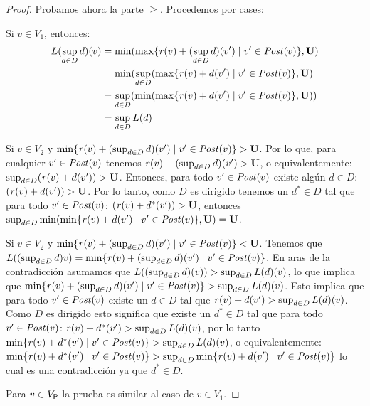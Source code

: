 \begin{proof}
    Probamos ahora la parte $\geq$.   Procedemos por cases:
    
    Si   $v \in V_1$,  entonces:
     \begin{align}
     L (\sup_{d \in D} d)(v) & = \min ( \max \{ \mathit{r}(v) + (\sup_{d \in D} d)(v') \mid v' \in \mathit{Post}(v)\},  \mathbf{U} ) \\                                                                                       
                                                     & =\min(  \sup_{d \in D} ( \max \{\mathit{r}(v) + d(v') \mid v' \in \mathit{Post}(v) \}, \mathbf{U} ) \\
                                                     & = \sup_{d \in D} (\min( \max \{ \mathit{r}(v) + d(v') \mid v' \in \mathit{Post}(v) \}, \mathbf{U})) \\
                                                     & =  \sup_{d \in D} L(d)
    \end{align}
    
    Si $v \in V_2$  y $\min \{ \mathit{r}(v) + (\sup_{d \in D} d)(v') \mid v' \in \mathit{Post}(v)\} > \mathbf{U}$. Por lo que, para
    cualquier $v' \in \mathit{Post}(v)$ tenemos  $\mathit{r}(v) + (\sup_{d \in D} d)(v') > \mathbf{U}$, o equivalentemente: 
    $\sup_{d \in D} (\mathit{r}(v) + d(v')) > \mathbf{U}$. Entonces, para todo $v' \in \mathit{Post}(v)$ existe algún $d \in D$: $(\mathit{r}(v) + d(v')) > \mathbf{U}$.
    Por lo tanto, como $D$ es dirigido tenemos un $d^* \in D$ tal que para todo $v' \in \mathit{Post}(v)$: $(\mathit{r}(v) + d^*(v')) > \mathbf{U}$, entonces 
    $\sup_{d \in D} \min ( \min \{ \mathit{r}(v) + d(v') \mid v' \in \mathit{Post}(v)\}, \mathbf{U}) = \mathbf{U}$.
     
     Si $v \in V_2$  y $\min \{ \mathit{r}(v) + (\sup_{d \in D} d)(v') \mid v' \in \mathit{Post}(v)\} < \mathbf{U}$.  Tenemos que
     $L((\sup_{d \in D} d) v) = \min \{ \mathit{r}(v) + (\sup_{d \in D} d)(v') \mid v' \in \mathit{Post}(v)\}$. En aras de la contradicción asumamos que $L((\sup_{d \in D} d)(v)) > \sup_{d \in D} L(d)(v)$, lo que implica que
    $\min \{ \mathit{r}(v) + (\sup_{d \in D} d)(v') \mid v' \in \mathit{Post}(v)\} > \sup_{d \in D} L(d)(v)$. Esto implica
    que para todo $v' \in \mathit{Post}(v)$ existe un $d \in D$ tal que  $\mathit{r}(v) + d(v')  > \sup_{d \in D} L(d)(v)$.
    Como $D$ es dirigido esto significa que existe un $d^* \in D$ tal que para todo $v' \in \mathit{Post}(v)$: $\mathit{r}(v) + d^*(v')  > \sup_{d \in D} L(d)(v)$,
    por lo tanto $\min \{ \mathit{r}(v) + d^*(v') \mid v' \in \mathit{Post}(v)  \} > \sup_{d \in D} L(d)(v)$, o equivalentemente:
    $\min \{ \mathit{r}(v) + d^*(v') \mid v' \in \mathit{Post}(v)  \} > \sup_{d \in D} \min \{ \mathit{r}(v) + d(v') \mid v' \in \mathit{Post}(v)\}$ lo cual es una contradicción ya que $d^* \in D$.
     
    Para $v \in V_{\mathsf{P}}$ la prueba es similar al caso de $v \in V_1$.\qedhere
\end{proof}
\fi

